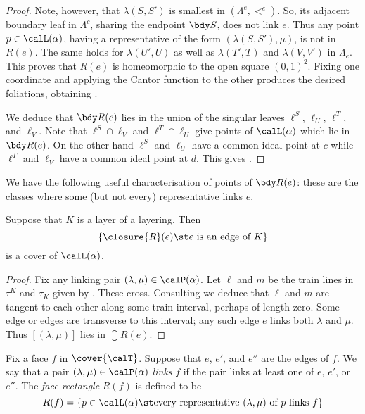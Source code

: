 \documentclass[12pt]{amsart}
\begin{document}
\begin{proof}
Note, however, that $\lambda(S, S')$ is smallest in $(\Lambda^e,<^e)$.  So, its adjacent boundary leaf in $\Lambda^c$, sharing the endpoint $\bdy S$, does not link $e$.  Thus any point $p \in \calL(\alpha)$, having a representative of the form $(\lambda(S, S'), \mu)$, is not in $R(e)$.  The same holds for $\lambda(U', U)$ as well as $\lambda(T', T)$ and $\lambda(V, V')$ in $\Lambda_e$.  This proves that $R(e)$ is homeomorphic to the open square $(0,1)^2$.  Fixing one coordinate and applying the Cantor function to the other produces the desired foliations, obtaining . 

We deduce that $\bdy R(e)$ lies in the union of the singular leaves $\ell^S$, $\ell_U$, $\ell^T$, and $\ell_V$.  Note that $\ell^S \cap \ell_V$ and $\ell^T \cap \ell_U$ give points of $\calL(\alpha)$ which lie in $\bdy R(e)$.  On the other hand $\ell^S$ and $\ell_U$ have a common ideal point at $c$ while $\ell^T$ and $\ell_V$ have a common ideal point at $d$.  This gives . 
\end{proof}

\begin{remark}
\label{Rem:BoundaryEdgeRectangle}
We have the following useful characterisation of points of $\bdy R(e)$: these are the classes where some (but not every) representative links $e$.  
\end{remark}



\begin{lemma}
\label{Lem:EdgesCover}
Suppose that $K$ is a layer of a layering.  Then
\[
\{ \closure{R}(e) \st \mbox{$e$ is an edge of $K$} \}
\]
is a cover of $\calL(\alpha)$. 
\end{lemma}

\begin{proof}
Fix any linking pair $(\lambda, \mu) \in \calP(\alpha)$.  Let $\ell$ and $m$ be the train lines in $\tau^K$ and $\tau_K$ given by .  These cross.  Consulting  we deduce that $\ell$ and $m$ are tangent to each other along some train interval, perhaps of length zero.  Some edge or edges are transverse to this interval; any such edge $e$ links both $\lambda$ and $\mu$.  Thus $[(\lambda, \mu)]$ lies in $\closure{R}(e)$.  
\end{proof}

\begin{definition}
\label{Def:FaceRectangle}
Fix a face $f$ in $\cover{\calT}$.  Suppose that $e$, $e'$, and $e''$ are the edges of $f$.  We say that a pair $(\lambda, \mu) \in \calP(\alpha)$ \emph{links} $f$ if the pair links at least one of $e$, $e'$, or $e''$.  The \emph{face rectangle} $R(f)$ is defined to be
\[
R(f) = \{ p \in \calL(\alpha) \st \mbox{every representative $(\lambda,\mu)$ of $p$ links $f$} \} \qedhere
\]
\end{definition}
\end{document}
